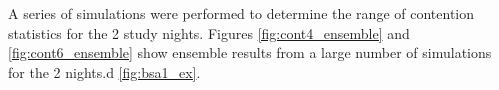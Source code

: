 A series of simulations were performed to determine the range of contention statistics for the 2 study nights. Figures \ref{fig:cont4_ensemble} and \ref{fig:cont6_ensemble} show ensemble results from a large number of simulations for the 2 nights.d \ref{fig:bsa1_ex}.

\begin{figure}[h]
 \begin{center}
\end{center}
\end{figure}
